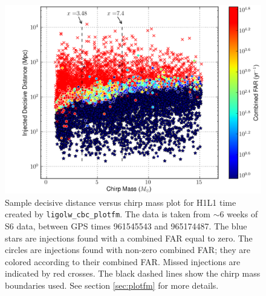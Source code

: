 \begin{figure}[p]
\label{fig:plotfm-dist_v_mchirp}
\center
\includegraphics[width=6in]{figures/H1L1-ligolw_cbc_plotfm_fm_dist_v_param_ALLINJ_CAT_4_VETO_F1_ALLINJ_PLOTTED-956707143-4838544.png}
\caption{Sample decisive distance versus chirp mass plot for H1L1 time created
by \texttt{ligolw\_cbc\_plotfm}. The data is taken from $\sim6$ weeks of
S6 data, between GPS times 961545543 and 965174487. The blue stars are
injections found with a combined FAR equal to zero. The circles are
injections found with non-zero combined FAR; they are colored according to
their combined FAR. Missed injections are indicated by red crosses. The
black dashed lines show the chirp mass boundaries used. See section
\ref{sec:plotfm} for more details.}
\end{figure}

